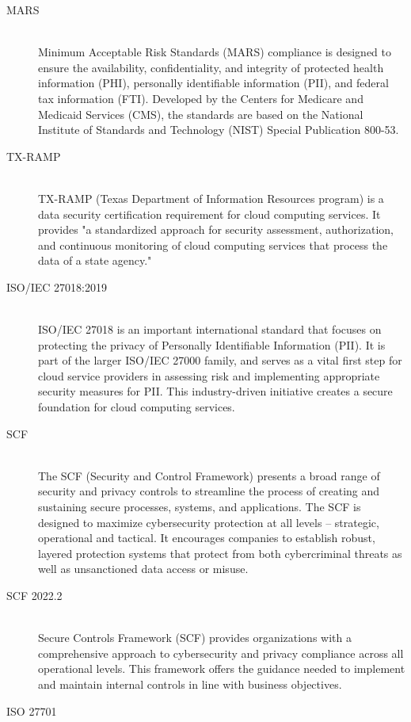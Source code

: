 \begin{description}
     \item[MARS] \hfill \\
          Minimum Acceptable Risk Standards (MARS) compliance is designed to ensure the availability, confidentiality, and integrity of protected health information (PHI), personally identifiable information (PII), and federal tax information (FTI). Developed by the Centers for Medicare and Medicaid Services (CMS), the standards are based on the National Institute of Standards and Technology (NIST) Special Publication 800-53.
     \item[TX-RAMP] \hfill \\
          TX-RAMP (Texas Department of Information Resources program) is a data security certification requirement for cloud computing services. It provides "a standardized approach for security assessment, authorization, and continuous monitoring of cloud computing services that process the data of a state agency."
     \item[ISO/IEC 27018:2019] \hfill \\
          ISO/IEC 27018 is an important international standard that focuses on protecting the privacy of Personally Identifiable Information (PII). It is part of the larger ISO/IEC 27000 family, and serves as a vital first step for cloud service providers in assessing risk and implementing appropriate security measures for PII. This industry-driven initiative creates a secure foundation for cloud computing services.
     \item[SCF] \hfill \\
          The SCF (Security and Control Framework) presents a broad range of security and privacy controls to streamline the process of creating and sustaining secure processes, systems, and applications. The SCF is designed to maximize cybersecurity protection at all levels – strategic, operational and tactical. It encourages companies to establish robust, layered protection systems that protect from both cybercriminal threats as well as unsanctioned data access or misuse.
     \item[SCF 2022.2] \hfill \\
          Secure Controls Framework (SCF) provides organizations with a comprehensive approach to cybersecurity and privacy compliance across all operational levels. This framework offers the guidance needed to implement and maintain internal controls in line with business objectives.
     \item[ISO 27701] \hfill \\

\end{description}
